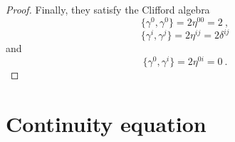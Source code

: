 \begin{proof}
        Finally, they satisfy the Clifford algebra 
        \begin{equation*}
            \{\gamma^0, \gamma^0\} = 2 \eta^{00} = 2 ~,
        \end{equation*}
        \begin{equation*}
            \{\gamma^i, \gamma^j\} = 2 \eta^{ij} = 2 \delta^{ij} 
        \end{equation*}
        and 
        \begin{equation*}
            \{\gamma^0, \gamma^i\} = 2 \eta^{0i} = 0 ~.
        \end{equation*}
    \end{proof}

\section{Continuity equation}
    

